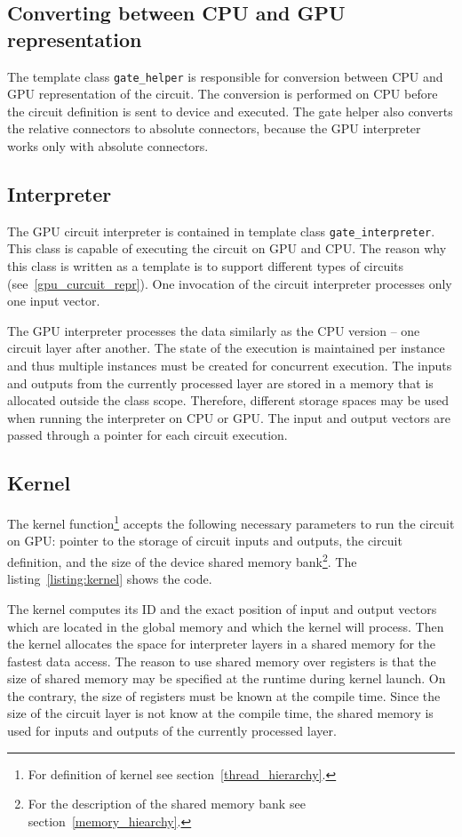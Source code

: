 \documentclass[12pt,twoside]{fithesis2}
\begin{document}
\subsection{Converting between CPU and GPU representation}

The template class \texttt{gate\_helper} is responsible for conversion between CPU and GPU representation of the circuit. The conversion is performed on CPU before the circuit definition is sent to device and executed. The gate helper also converts the relative connectors to absolute connectors, because the GPU interpreter works only with absolute connectors.

\subsection{Interpreter}

The GPU circuit interpreter is contained in template class \texttt{gate\_interpreter}. This class is capable of executing the circuit on GPU and CPU. The reason why this class is written as a template is to support different types of circuits (see~\ref{gpu_curcuit_repr}). One invocation of the circuit interpreter processes only one input vector.

The GPU interpreter processes the data similarly as the CPU version -- one circuit layer after another. The state of the execution is maintained per instance and thus multiple instances must be created for concurrent execution. The inputs and outputs from the currently processed layer are stored in a memory that is allocated outside the class scope. Therefore, different storage spaces may be used when running the interpreter on CPU or GPU. The input and output vectors are passed through a pointer for each circuit execution.

\subsection{Kernel}

The kernel function\footnote{For definition of kernel see section~\ref{thread_hierarchy}.} accepts the following necessary parameters to run the circuit on GPU: pointer to the storage of circuit inputs and outputs, the circuit definition, and the size of the device shared memory bank\footnote{For the description of the shared memory bank see section~\ref{memory_hiearchy}.}. The listing~\ref{listing:kernel} shows the code.

The kernel computes its ID and the exact position of input and output vectors which are located in the global memory and which the kernel will process. Then the kernel allocates the space for interpreter layers in a shared memory for the fastest data access. The reason to use shared memory over registers is that the size of shared memory may be specified at the runtime during kernel launch. On the contrary, the size of registers must be known at the compile time. Since the size of the circuit layer is not know at the compile time, the shared memory is used for inputs and outputs of the currently processed layer.
\end{document}
